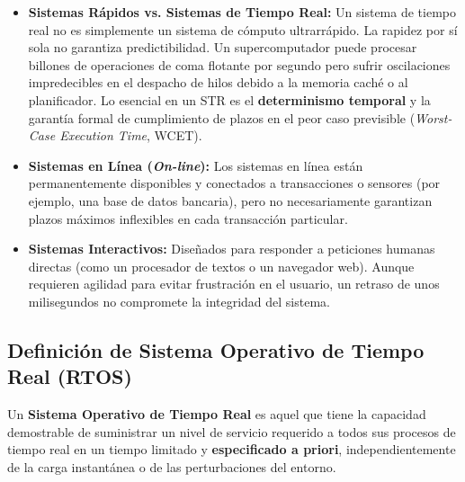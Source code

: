 \begin{itemize}[leftmargin=*]
    \item \textbf{Sistemas Rápidos vs. Sistemas de Tiempo Real:} Un sistema de tiempo real no es simplemente un sistema de cómputo ultrarrápido. La rapidez por sí sola no garantiza predictibilidad. Un supercomputador puede procesar billones de operaciones de coma flotante por segundo pero sufrir oscilaciones impredecibles en el despacho de hilos debido a la memoria caché o al planificador. Lo esencial en un STR es el \textbf{determinismo temporal} y la garantía formal de cumplimiento de plazos en el peor caso previsible (\textit{Worst-Case Execution Time}, WCET).
    \item \textbf{Sistemas en Línea (\textit{On-line}):} Los sistemas en línea están permanentemente disponibles y conectados a transacciones o sensores (por ejemplo, una base de datos bancaria), pero no necesariamente garantizan plazos máximos inflexibles en cada transacción particular.
    \item \textbf{Sistemas Interactivos:} Diseñados para responder a peticiones humanas directas (como un procesador de textos o un navegador web). Aunque requieren agilidad para evitar frustración en el usuario, un retraso de unos milisegundos no compromete la integridad del sistema.
\end{itemize}

\subsection{Definición de Sistema Operativo de Tiempo Real (RTOS)}
\begin{definicion}
Un \textbf{Sistema Operativo de Tiempo Real} es aquel que tiene la capacidad demostrable de suministrar un nivel de servicio requerido a todos sus procesos de tiempo real en un tiempo limitado y \textbf{especificado a priori}, independientemente de la carga instantánea o de las perturbaciones del entorno.
\end{definicion}

